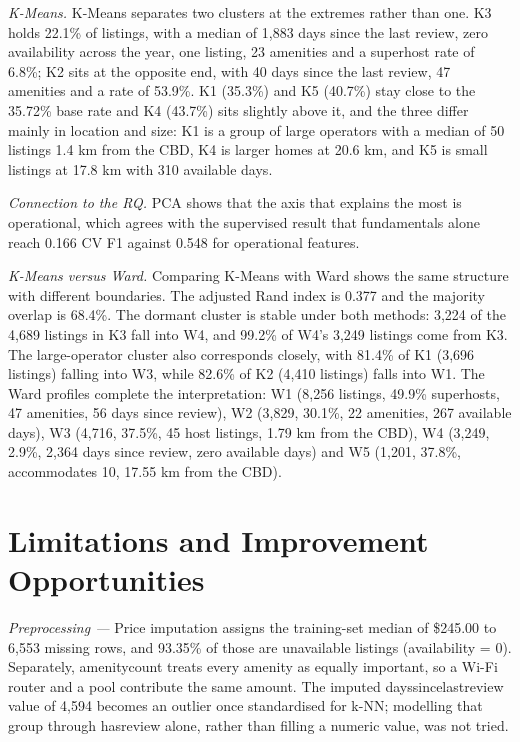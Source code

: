 \documentclass[final,1p,11pt]{elsarticle}
\renewcommand\_{\textunderscore\allowbreak}%
\begin{document}
\textit{K-Means.} K-Means separates two clusters at the extremes rather than one. K3 holds 22.1\% of listings, with a median of 1,883 days since the last review, zero availability across the year, one listing, 23 amenities and a superhost rate of 6.8\%; K2 sits at the opposite end, with 40 days since the last review, 47 amenities and a rate of 53.9\%. K1 (35.3\%) and K5 (40.7\%) stay close to the 35.72\% base rate and K4 (43.7\%) sits slightly above it, and the three differ mainly in location and size: K1 is a group of large operators with a median of 50 listings 1.4 km from the CBD, K4 is larger homes at 20.6 km, and K5 is small listings at 17.8 km with 310 available days.

\textit{Connection to the RQ.} PCA shows that the axis that explains the most is operational, which agrees with the supervised result that fundamentals alone reach 0.166 CV F1 against 0.548 for operational features.

\textit{K-Means versus Ward.} Comparing K-Means with Ward shows the same structure with different boundaries. The adjusted Rand index is 0.377 and the majority overlap is 68.4\%. The dormant cluster is stable under both methods: 3,224 of the 4,689 listings in K3 fall into W4, and 99.2\% of W4's 3,249 listings come from K3. The large-operator cluster also corresponds closely, with 81.4\% of K1 (3,696 listings) falling into W3, while 82.6\% of K2 (4,410 listings) falls into W1. The Ward profiles complete the interpretation: W1 (8,256 listings, 49.9\% superhosts, 47 amenities, 56 days since review), W2 (3,829, 30.1\%, 22 amenities, 267 available days), W3 (4,716, 37.5\%, 45 host listings, 1.79 km from the CBD), W4 (3,249, 2.9\%, 2,364 days since review, zero available days) and W5 (1,201, 37.8\%, accommodates 10, 17.55 km from the CBD).

\section{Limitations and Improvement Opportunities}

\textit{Preprocessing —} Price imputation assigns the training-set median of \$245.00 to 6,553 missing rows, and 93.35\% of those are unavailable listings (availability\_365 = 0). Separately, amenity\_count treats every amenity as equally important, so a Wi-Fi router and a pool contribute the same amount. The imputed days\_since\_last\_review value of 4,594 becomes an outlier once standardised for k-NN; modelling that group through has\_review alone, rather than filling a numeric value, was not tried.
\end{document}
